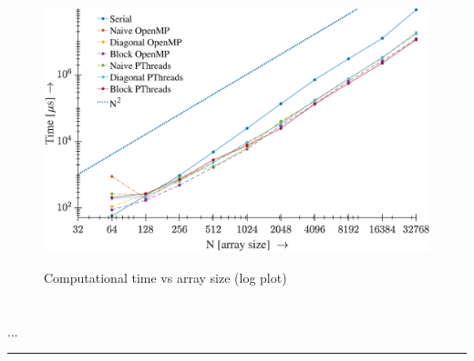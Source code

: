 \begin{appendices}
\begin{table}[ht]
{\begin{tabular}{@{}crrrrrrr@{}}
    \end{tabular} \hfill}
\end{table}

\vspace{50pt}

\begin{figure}[h] \centering
    {\hspace{-30pt}%
    \includegraphics[width=0.95\linewidth]{images/asymptotic.eps}}
    \caption{Computational time vs array size (log plot)}
    \label{fig:big_o} 
\end{figure}

\newpage
\section{} \label{app:II}

{{\selectfont ...} %
\rule{0.975\textwidth}{.6pt}
\label{code:matrix}

}
\end{appendices}
